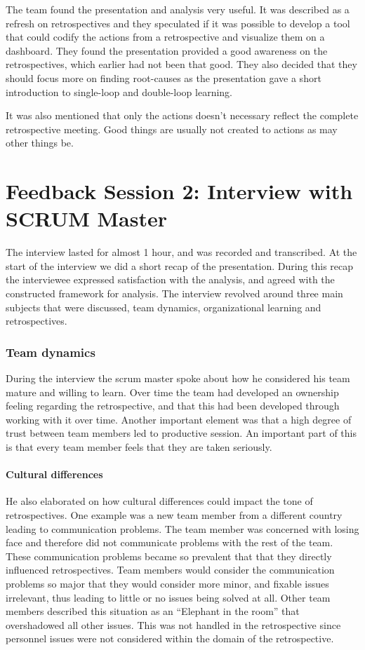 The team found the presentation and analysis very useful. It was described as a refresh on retrospectives and they speculated if it was possible to develop a tool that could codify the actions from a retrospective and visualize them on a dashboard. They found the presentation provided a good awareness on the retrospectives, which earlier had not been that good. They also decided that they should focus more on finding root-causes as the presentation gave a short introduction to single-loop and double-loop learning.

It was also mentioned that only the actions doesn't necessary reflect the complete retrospective meeting. Good things are usually not created to actions as may other things be. 
\clearpage

\section{Feedback Session 2: Interview with SCRUM Master}
The interview lasted for almost 1 hour, and was recorded and transcribed. At the start of the interview we did a short recap of the presentation. During this recap the interviewee expressed satisfaction with the analysis, and agreed with the constructed framework for analysis. The interview revolved around three main subjects that were discussed, team dynamics, organizational learning and retrospectives.

\subsubsection{Team dynamics}

During the interview the scrum master spoke about how he considered his team mature and willing to learn. Over time the team had developed an ownership feeling regarding the retrospective, and that this had been developed through working with it over time. Another important element was that a high degree of trust between team members led to productive session. An important part of this is that every team member feels that they are taken seriously. 

\paragraph{Cultural differences}
He also elaborated on how cultural differences could impact the tone of retrospectives. One example was a new team member from a different country leading to communication problems. The team member was concerned with losing face and therefore did not communicate problems with the rest of the team. These communication problems became so prevalent that that they directly influenced retrospectives. Team members would consider the communication problems so major that they would consider more minor, and fixable issues irrelevant, thus leading to little or no issues being solved at all.  Other team members described this situation as an ``Elephant in the room'' that overshadowed all other issues. This was not handled in the retrospective since personnel issues were not considered within the domain of the retrospective.

